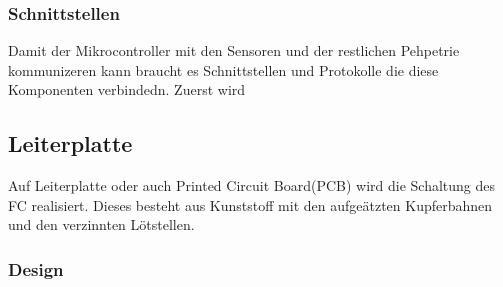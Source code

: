 \documentclass[12pt,a4paper, ngerman]{article}
\begin{document}
\subsubsection{Schnittstellen}
Damit der Mikrocontroller mit den Sensoren und der restlichen Pehpetrie kommunizeren kann braucht es Schnittstellen und Protokolle die diese Komponenten verbindedn. Zuerst wird 

\subsection{Leiterplatte}
Auf Leiterplatte oder auch Printed Circuit Board(PCB) wird die Schaltung des FC realisiert. Dieses besteht aus Kunststoff mit den aufgeätzten Kupferbahnen und den verzinnten Lötstellen.
\subsubsection{Design}
\end{document}
